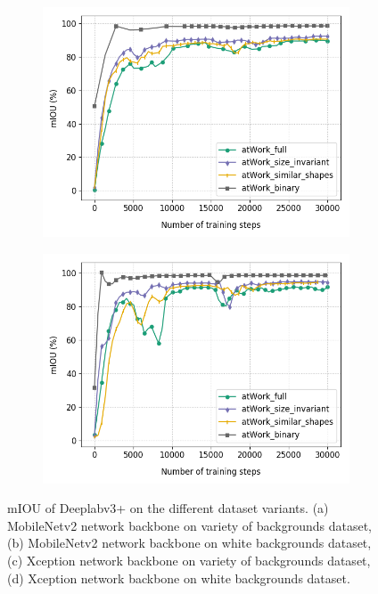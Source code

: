 \begin{figure}
\begin{subfigure}{.5\textwidth}
			\includegraphics[width=1\linewidth]{images/xcep_4vars}
			\label{Fig:xcepvarsa}
			\caption{}
		\end{subfigure}
		\begin{subfigure}{.5\textwidth}
			\centering
			\includegraphics[width=1\linewidth]{images/xcep_4vars_white}
			\label{Fig:xcepvarsb}
			\caption{}
		\end{subfigure}
		\caption{mIOU of Deeplabv3+ on the different dataset variants. (a) MobileNetv2 network backbone on variety of backgrounds dataset, (b) MobileNetv2 network backbone on white backgrounds dataset, (c) Xception network backbone on variety of backgrounds dataset, (d) Xception network backbone on white backgrounds dataset.}
		\label{Fig:vars}
	\end{figure}
	
